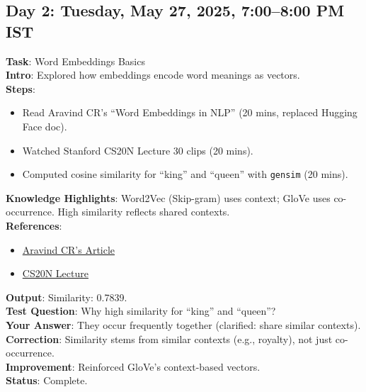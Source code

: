 \documentclass[a4paper,12pt]{article}
\begin{document}
\subsection*{Day 2: Tuesday, May 27, 2025, 7:00--8:00 PM IST}
\textbf{Task}: Word Embeddings Basics \\
\textbf{Intro}: Explored how embeddings encode word meanings as vectors. \\
\textbf{Steps}:
\begin{itemize}
    \item Read Aravind CR’s ``Word Embeddings in NLP'' (20 mins, replaced Hugging Face doc).
    \item Watched Stanford CS20N Lecture 30 clips (20 mins).
    \item Computed cosine similarity for ``king'' and ``queen'' with \texttt{gensim} (20 mins).
\end{itemize}
\textbf{Knowledge Highlights}: Word2Vec (Skip-gram) uses context; GloVe uses co-occurrence. High similarity reflects shared contexts. \\
\textbf{References}: 
\begin{itemize}
    \item \href{https://medium.com/analytics-vidhya/word-embeddings-in-nlp-word2vec-glove-fasttext-28d91c3741f1}{Aravind CR’s Article}
    \item \href{https://www.youtube.com/watch?v=rmVRLe5D7YI}{CS20N Lecture}
\end{itemize}
\textbf{Output}: Similarity: 0.7839. \\
\textbf{Test Question}: Why high similarity for ``king'' and ``queen''? \\
\textbf{Your Answer}: They occur frequently together (clarified: share similar contexts). \\
\textbf{Correction}: Similarity stems from similar contexts (e.g., royalty), not just co-occurrence. \\
\textbf{Improvement}: Reinforced GloVe’s context-based vectors. \\
\textbf{Status}: Complete.

\end{document}
